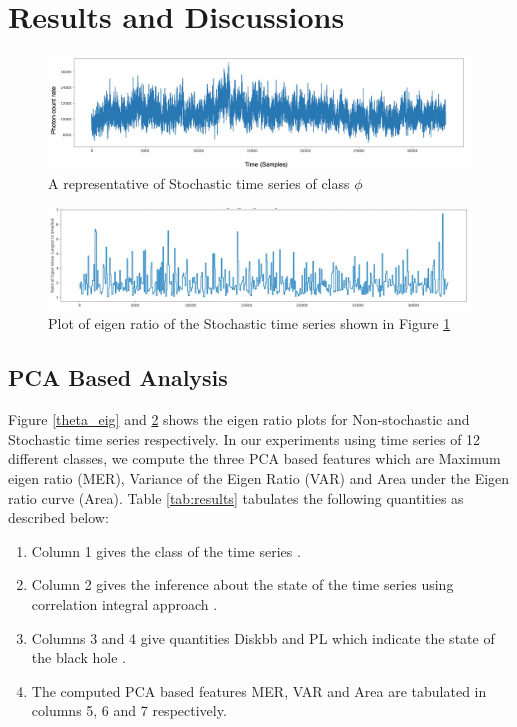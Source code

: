 \documentclass[10pt,conference]{IEEEtran}
\begin{document}
\section{Results and Discussions}


\begin{figure}[ht]
  \centering
  \includegraphics[width=0.9\linewidth]{phi_ts_edited.drawio.png}
  \caption{A representative of Stochastic time series of class $\phi$}
  \label{phi_ts}
  \end{figure}

\begin{figure}[ht]
  \centering
  \includegraphics[width=0.9\linewidth]{phi_ts_eig.png}
  \caption{Plot of eigen ratio of the Stochastic time series shown in Figure \ref{phi_ts}}
  \label{phi_eig}
\end{figure}

\subsection{PCA Based Analysis}

Figure \ref{theta_eig}  and \ref{phi_eig} shows the eigen ratio plots for Non-stochastic and Stochastic time series respectively. In our experiments using time series of 12 different classes, we compute the three PCA based features which are Maximum eigen ratio (MER), Variance of the Eigen Ratio (VAR) and Area under the Eigen ratio curve (Area). Table \ref{tab:results} tabulates the following quantities as described below:

\begin{enumerate}
  \item Column 1 gives the class of the time series \cite{Adegoke2018}.
  \item Column 2 gives the inference about the state of the time series using correlation integral approach \cite{Adegoke2018}.
  \item Columns 3 and 4 give  quantities Diskbb and  PL which indicate the state of the black hole \cite{Adegoke2018}.
  \item The computed PCA based features MER, VAR and Area  are tabulated in columns 5, 6 and 7 respectively.
\end{enumerate}
\end{document}
